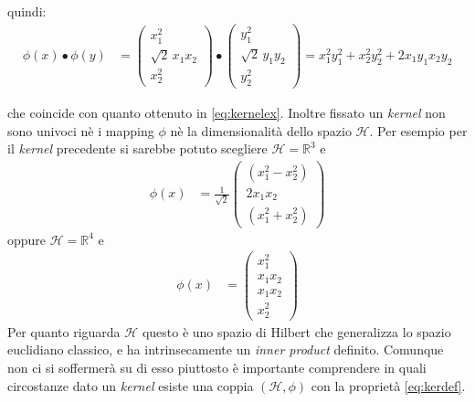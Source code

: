   quindi:
 \begin{align*}
    \phi(x) \bullet \phi(y) &= \begin{pmatrix}
           x_{1}^2 \\
           \sqrt{2}\,x_{1}x_{2} \\
           x_{2}^2
         \end{pmatrix}\bullet
         \begin{pmatrix}
           y_{1}^2 \\
           \sqrt{2}\,y_{1}y_{2} \\
           y_{2}^2
         \end{pmatrix} = x_{1}^{2}y_{1}^{2} + x_{2}^{2}y_{2}^{2} + 2x_{1}y_{1}x_{2}y_{2}
  \end{align*}

che coincide con quanto ottenuto in \eqref{eq:kernelex}. Inoltre fissato un \textit{kernel} non sono univoci nè i mapping $\phi$ nè la dimensionalità dello spazio $\mathcal{H}$. Per esempio per il \textit{kernel} precedente si sarebbe potuto scegliere $\mathcal{H} = \mathbb{R}^3$ e 
 \begin{align*}
    \phi(x) &= \frac{1}{\sqrt{2}}\begin{pmatrix}
           (x_{1}^2 - x_{2}^2)\\
           2x_{1}x_{2} \\
           (x_{1}^2 + x_{2}^2)
         \end{pmatrix}
  \end{align*}
  oppure $\mathcal{H} = \mathbb{R}^4$ e
  \begin{align*}
    \phi(x) &= \begin{pmatrix}
           x_{1}^2\\
           x_{1}x_{2} \\
           x_{1}x_{2} \\
           x_{2}^2
         \end{pmatrix}
  \end{align*}
Per quanto riguarda $\mathcal{H}$ questo è uno spazio di Hilbert che generalizza lo spazio euclidiano classico, e ha intrinsecamente un \textit{inner product} definito. Comunque non ci si soffermerà su di esso piuttosto è importante comprendere in quali circostanze dato un \textit{kernel} esiste una coppia $(\mathcal{H} , \phi)$ con la proprietà \eqref{eq:kerdef}.
